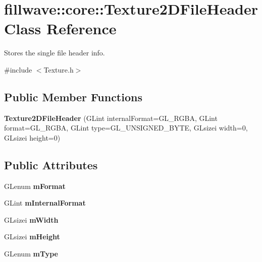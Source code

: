 \hypertarget{classfillwave_1_1core_1_1Texture2DFileHeader}{}\section{fillwave\+:\+:core\+:\+:Texture2\+D\+File\+Header Class Reference}
\label{classfillwave_1_1core_1_1Texture2DFileHeader}


Stores the single file header info.  




{\ttfamily \#include $<$Texture.\+h$>$}

\subsection*{Public Member Functions}
\begin{DoxyCompactItemize}
\item 
\hypertarget{classfillwave_1_1core_1_1Texture2DFileHeader_abd08df73b17707ca54fe013608e20525}{}{\bfseries Texture2\+D\+File\+Header} (G\+Lint internal\+Format=G\+L\+\_\+\+R\+G\+B\+A, G\+Lint format=G\+L\+\_\+\+R\+G\+B\+A, G\+Lint type=G\+L\+\_\+\+U\+N\+S\+I\+G\+N\+E\+D\+\_\+\+B\+Y\+T\+E, G\+Lsizei width=0, G\+Lsizei height=0)\label{classfillwave_1_1core_1_1Texture2DFileHeader_abd08df73b17707ca54fe013608e20525}

\end{DoxyCompactItemize}
\subsection*{Public Attributes}
\begin{DoxyCompactItemize}
\item 
\hypertarget{classfillwave_1_1core_1_1Texture2DFileHeader_ad779c75f34484880e758d94ccca8b984}{}G\+Lenum {\bfseries m\+Format}\label{classfillwave_1_1core_1_1Texture2DFileHeader_ad779c75f34484880e758d94ccca8b984}

\item 
\hypertarget{classfillwave_1_1core_1_1Texture2DFileHeader_ab12dc9da651402563f43ace606d63778}{}G\+Lint {\bfseries m\+Internal\+Format}\label{classfillwave_1_1core_1_1Texture2DFileHeader_ab12dc9da651402563f43ace606d63778}

\item 
\hypertarget{classfillwave_1_1core_1_1Texture2DFileHeader_aa5c69ffaa29e70fb75a86b9ecf959b7d}{}G\+Lsizei {\bfseries m\+Width}\label{classfillwave_1_1core_1_1Texture2DFileHeader_aa5c69ffaa29e70fb75a86b9ecf959b7d}

\item 
\hypertarget{classfillwave_1_1core_1_1Texture2DFileHeader_a9c1ce20836e07c93b06d7d9e0d2f0d2f}{}G\+Lsizei {\bfseries m\+Height}\label{classfillwave_1_1core_1_1Texture2DFileHeader_a9c1ce20836e07c93b06d7d9e0d2f0d2f}

\item 
\hypertarget{classfillwave_1_1core_1_1Texture2DFileHeader_a2efb8a7745331de7dabc4718dbdda291}{}G\+Lenum {\bfseries m\+Type}\label{classfillwave_1_1core_1_1Texture2DFileHeader_a2efb8a7745331de7dabc4718dbdda291}

\end{DoxyCompactItemize}


